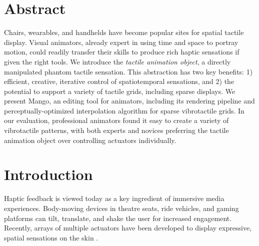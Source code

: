 


\section{Abstract}
Chairs, wearables, and handhelds have become popular sites for spatial tactile display.
Visual animators, 
already expert in using time and space to portray motion, could readily transfer their skills to produce rich haptic sensations if given the right tools.
We introduce the \emph{tactile animation object}, a directly manipulated phantom tactile sensation.
This abstraction has two key benefits: 1) efficient, creative, iterative control of spatiotemporal sensations,
and 2) the potential to support a variety of tactile grids, including sparse displays.
We present Mango, an editing tool for animators, including its rendering pipeline and perceptually-optimized interpolation algorithm for sparse vibrotactile grids.
In our evaluation,
professional animators found it easy to create a variety of
vibrotactile patterns, with both experts and novices preferring the tactile animation object over
controlling actuators individually.

  
%
%
\section{Introduction}

Haptic feedback is
viewed today %
as a key ingredient of immersive media experiences.
Body-moving devices in theatre seats, ride vehicles, and gaming platforms can tilt, translate, and shake the user for increased engagement. 
Recently, arrays of multiple actuators have been developed to display expressive, spatial sensations on the skin 
\cite{Israr2011,Danieau2012a,Sodhi2013,Kim2009,Wilson2014}. 

